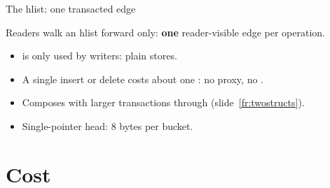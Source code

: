 \documentclass[aspectratio=169, 10pt, t, xcolor=table]{beamer}
\def\kickertext{}
\newcommand{\talksection}[1]{\section{#1}\gdef\kickertext{#1}}
\newcommand{\lead}[1]{{\large #1\par}}
\begin{document}
\begin{frame}{The hlist: one transacted edge}
\lead{Readers walk an hlist forward only: \textbf{one} reader-visible edge
per operation.}
\vspace{4mm}
\begin{itemize}
\item {} is only used by writers: plain stores.
\item A single insert or delete costs about one :
      no proxy, no .
\item Composes with larger transactions through 
      (slide~\ref{fr:twostructs}).
\item Single-pointer head: 8 bytes per bucket.
\end{itemize}
\end{frame}

\talksection{Cost}
\end{document}
